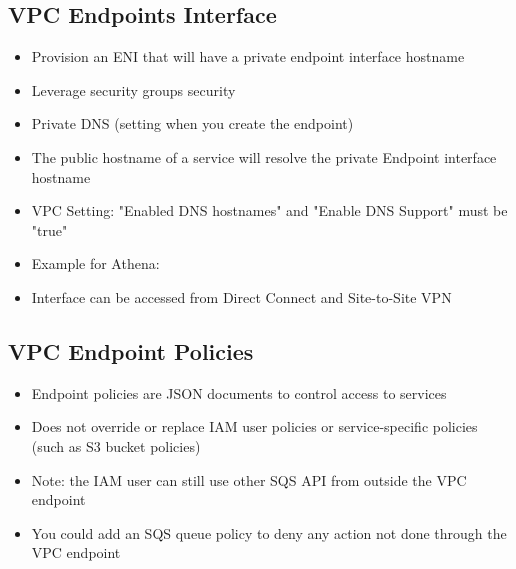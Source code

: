 \subsection{VPC Endpoints Interface}
\begin{itemize}
    \item Provision an ENI that will have a private endpoint interface hostname
    \item Leverage security groups security
    \item Private DNS (setting when you create the endpoint)
    \item The public hostname of a service will resolve the private Endpoint interface hostname
    \item VPC Setting: "Enabled DNS hostnames" and "Enable DNS Support" must be "true"
    \item Example for Athena:
    \item Interface can be accessed from Direct Connect and Site-to-Site VPN
\end{itemize}

\subsection{VPC Endpoint Policies}
\begin{itemize}
    \item Endpoint policies are JSON documents to control access to services
    \item Does not override or replace IAM user policies or service-specific policies (such as S3 bucket policies)


    \item Note: the IAM user can still use other SQS API from outside the VPC endpoint
    \item You could add an SQS queue policy to deny any action not done through the VPC endpoint
\end{itemize}


